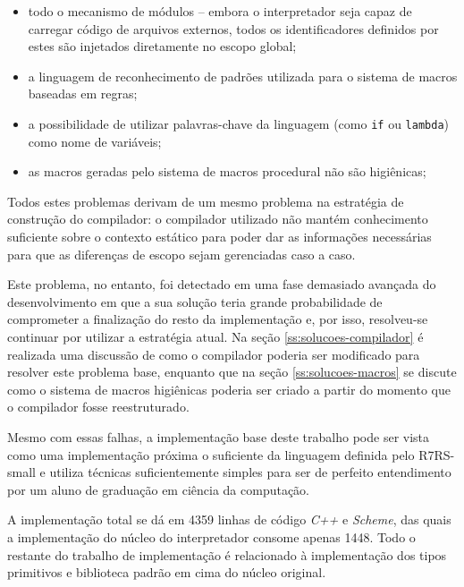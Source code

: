 \begin{itemize}

\item todo o mecanismo de módulos -- embora o interpretador seja capaz de carregar 
código de arquivos externos, todos os identificadores definidos por estes são 
injetados diretamente no escopo global;

\item a linguagem de reconhecimento de padrões utilizada para o sistema de macros
baseadas em regras;

\item a possibilidade de utilizar palavras-chave da linguagem (como \texttt{if} ou
\texttt{lambda}) como nome de variáveis;

\item as macros geradas pelo sistema de macros procedural não são higiênicas;

\end{itemize}

Todos estes problemas derivam de um mesmo problema na estratégia de construção do 
compilador: o compilador utilizado não mantém conhecimento suficiente sobre o 
contexto estático para poder dar as informações necessárias para que as diferenças
de escopo sejam gerenciadas caso a caso.

Este problema, no entanto, foi detectado em uma fase demasiado avançada do
desenvolvimento em que a sua solução teria grande probabilidade de comprometer
a finalização do resto da implementação e, por isso, resolveu-se continuar por
utilizar a estratégia atual. Na seção \ref{ss:solucoes-compilador} é realizada
uma discussão de como o compilador poderia ser modificado para resolver este
problema base, enquanto que na seção \ref{ss:solucoes-macros} se discute como
o sistema de macros higiênicas poderia ser criado a partir do momento que o
compilador fosse reestruturado.

Mesmo com essas falhas, a implementação base deste trabalho pode ser vista como
uma implementação próxima o suficiente da linguagem definida pelo
\acs{R7RS}-small e utiliza técnicas suficientemente simples para ser de
perfeito entendimento por um aluno de graduação em ciência da computação. 

A implementação total se dá em 4359 linhas de código \textit{C++} e
\textit{Scheme}, das quais a implementação do núcleo do interpretador consome
apenas 1448. Todo o restante do trabalho de implementação é relacionado à
implementação dos tipos primitivos e biblioteca padrão em cima do núcleo
original.

